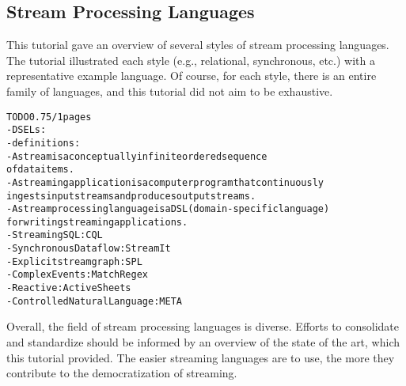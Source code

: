 \subsection{Stream Processing Languages}

This tutorial gave an overview of several styles of stream processing
languages. The tutorial illustrated each style (e.g., relational,
synchronous, etc.) with a representative example language. Of course,
for each style, there is an entire family of languages, and this
tutorial did not aim to be exhaustive.

\begin{alltt}TODO\scriptsize 0.75/1 pages
- DSELs: \cite{hudak_1998}
- definitions:
  - A stream is a conceptually infinite ordered sequence
    of data items.
  - A streaming application is a computer program that continuously
    ingests input streams and produces output streams.
  - A stream processing language is a DSL (domain-specific language)
    for writing streaming applications.
- Streaming SQL: CQL \cite{arasu_babu_widom_2006}
- Synchronous Dataflow: StreamIt \cite{thies_et_al_2002}
- Explicit stream graph: SPL \cite{hirzel_schneider_gedik_2017}
- Complex Events: MatchRegex \cite{hirzel_2012}
- Reactive: ActiveSheets \cite{vaziri_et_al_2014}
- Controlled Natural Language: META \cite{arnold_et_al_2016}
\end{alltt}

Overall, the field of stream processing languages is diverse.  Efforts
to consolidate and standardize should be informed by an overview of
the state of the art, which this tutorial provided. The easier
streaming languages are to use, the more they contribute to the
democratization of streaming.
